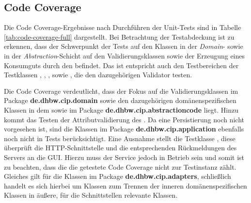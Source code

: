 \subsection*{Code Coverage}
Die Code Coverage-Ergebnisse nach Durchführen der Unit-Tests sind in Tabelle \ref{tab:code-coverage-full} dargestellt.
Bei Betrachtung der Testabdeckung ist zu erkennen, dass der Schwerpunkt der Tests auf den Klassen in der \textit{Domain}- sowie in der \textit{Abstraction}-Schicht auf den Validierungsklassen sowie der Erzeugung eines Konsumguts durch den \href{}{} befindet.
Das ist entspricht auch den Testbereichen der Testklassen \href{}{}, \href{}{}, \href{}{}, \href{}{} sowie \href{}{}, die den dazugehörigen Validator testen.

Die Code Coverage verdeutlicht, dass der Fokus auf die Validierungsklassen im Package \textbf{de.dhbw.cip.domain} sowie den dazugehörigen domänenspezifischen Klassen in dem sowie im Package \textbf{de.dhbw.cip.abstractioncode} liegt. 
Hinzu kommt das Testen der Attributvalidierung des \href{}{}.
Da eine Persistierung noch nicht vorgesehen ist, sind die Klassen im Package \textbf{de.dhbw.cip.application} ebenfalls noch nicht in Tests berücksichtigt.
Eine Ausnahme stellt die Testklasse \href{}{}, diese überprüft die \ac{HTTP}-Schnittstelle und die entsprechenden Rückmeldungen des Servers an die GUI. 
Hierzu muss der Service jedoch in Betrieb sein und somit ist zu beachten, dass die die getestete Code Coverage nicht zur Testinstanz zählt.
Gleiches gilt für die Klassen im Package \textbf{de.dhbw.cip.adapters}, schließlich handelt es sich hierbei um Klassen zum Trennen der inneren domänenspezifischen Klassen in äußere, für die Schnittstellen relevante Klassen.

